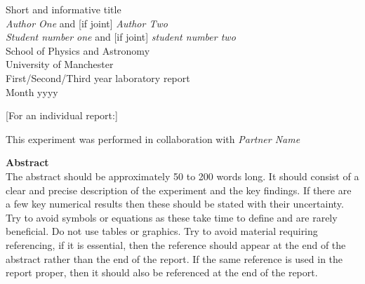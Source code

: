 \documentclass[11pt]{article} %
\begin{document}
\begin{titlepage} %
\begin{center} %

{\Huge Short and informative title}\\[0.5cm] %
\textit{Author One} and {\color{blue}[if joint]} \textit{Author Two}~\\[0.3cm] %
\textit{Student number one} and {\color{blue}[if joint]} \textit{student number two}~\\[0.3cm]
School of Physics and Astronomy~\\[0.3cm]
University of Manchester~\\[0.3cm]
First/Second/Third year laboratory report~\\[0.3cm]
Month yyyy~\\[2cm]


\begin{flushleft}
{\color{blue}[For an individual report:]\\}
\end{flushleft}

This experiment was performed in collaboration with \textit{Partner Name}~\\[2cm] %

\end{center}
{\Large \textbf{Abstract}}~\\[0.3cm]

 The abstract should be approximately 50 to 200 words long. It should consist of a clear and precise description of the experiment and the key findings. If there are a few key numerical results then these should be stated with their uncertainty. Try to avoid symbols or equations as these take time to define and are rarely beneficial. Do not use tables or graphics. Try to avoid material requiring referencing, if it is essential, then the reference should appear at the end of the abstract rather than the end of the report. If the same reference is used in the report proper, then it should also be referenced at the end of the report.\\


\end{titlepage}
\end{document}
